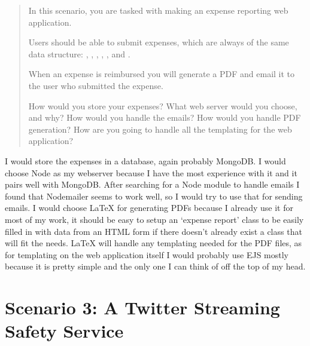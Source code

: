 \documentclass[12pt, letterpaper]{homework}
\begin{document}
\begin{quote}
    In this scenario, you are tasked with making an expense reporting web
    application.

    Users should be able to submit expenses, which are always of the same data
    structure: , , , ,
    , and .

    When an expense is reimbursed you will generate a PDF and email it to the user
    who submitted the expense.

    How would you store your expenses? What web server would you choose, and why?
    How would you handle the emails? How would you handle PDF generation? How are
    you going to handle all the templating for the web application?
\end{quote}

I would store the expenses in a database, again probably MongoDB\@. I would
choose Node as my webserver because I have the most experience with it and it
pairs well with MongoDB\@. After searching for a Node module to handle emails I
found that Nodemailer seems to work well, so I would try to use that for sending
emails. I would choose \LaTeX{} for generating PDFs because I already use it for
most of my work, it should be easy to setup an `expense report' class to be
easily filled in with data from an HTML form if there doesn't already exist a
class that will fit the needs. \LaTeX{} will handle any templating needed for
the PDF files, as for templating on the web application itself I would probably
use EJS mostly because it is pretty simple and the only one I can think of off
the top of my head.

\pagebreak{}
\section*{Scenario 3: A Twitter Streaming Safety Service}
\end{document}
